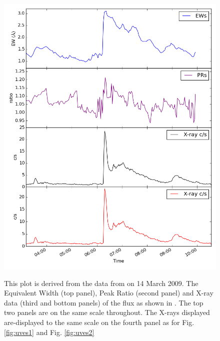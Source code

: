 \begin{figure}[!htbp]
\centering
\includegraphics[scale=0.30]{Figures/uves3.png} \\
\caption{This plot is derived from the data from {\uves} on 14 March 2009.
  The Equivalent Width (top panel), Peak Ratio (second panel) and X-ray data (third and bottom panels) of the
  {\ha} flux as shown in \citet[Fig. 1]{fuhrmeister11}. The top two panels are on the same scale
  throughout. The X-rays displayed are-displayed to the same scale on the fourth panel as for Fig. \ref{fig:uves1} and
  Fig. \ref{fig:uves2}}
 \protect\label{fig:uves3}
\end{figure}

